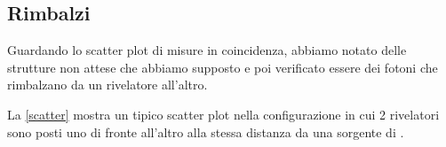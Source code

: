 \subsection{Rimbalzi}

Guardando lo scatter plot di misure in coincidenza, abbiamo notato delle strutture non attese che abbiamo supposto e poi verificato essere dei fotoni che rimbalzano da un rivelatore all'altro.

La \autoref{scatter} mostra un tipico scatter plot nella configurazione in cui 2 rivelatori sono posti uno di fronte all'altro alla stessa distanza da una sorgente di \na{}.
